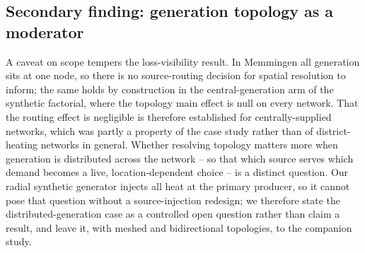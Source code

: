 \documentclass[a4paper,fleqn]{cas-dc}
\begin{document}
\subsection{Secondary finding: generation topology as a moderator}
A caveat on scope tempers the loss-visibility result. In Memmingen all generation sits at
one node, so there is no source-routing decision for spatial resolution to inform; the same
holds by construction in the central-generation arm of the synthetic factorial, where the
topology main effect is null on every network. That the routing effect is negligible is
therefore established for centrally-supplied networks, which was partly a property of the
case study rather than of district-heating networks in general. Whether resolving topology
matters more when generation is distributed across the network -- so that which source
serves which demand becomes a live, location-dependent choice -- is a distinct question. Our
radial synthetic generator injects all heat at the primary producer, so it cannot pose that
question without a source-injection redesign; we therefore state the distributed-generation
case as a controlled open question rather than claim a result, and leave it, with meshed and
bidirectional topologies, to the companion study.
\end{document}
